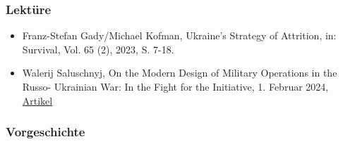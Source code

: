 {}\documentclass[a4paper]{article}
\providecommand{\tightlist}{\setlength{\itemsep}{1mm}\setlength{\parskip}{1mm}}
\begin{document}
\subsubsection{Lektüre}\label{lektuxfcre-9}

\begin{itemize}
	\tightlist
	\item
	      Franz-Stefan Gady/Michael Kofman, Ukraine's Strategy of Attrition, in:
	      Survival, Vol. 65 (2), 2023, S. 7-18.
	\item
	      Walerij Saluschnyj, On the Modern Design of Military Operations in the
	      Russo- Ukrainian War: In the Fight for the Initiative, 1. Februar
	      2024,
	      \href{https://s3.documentcloud.org/documents/24400154/ukraine-valerii-zaluzhnyi-essaydesign-of-war.pdf}{Artikel}
\end{itemize}

\subsubsection{Vorgeschichte}\label{vorgeschichte-1}
\end{document}
